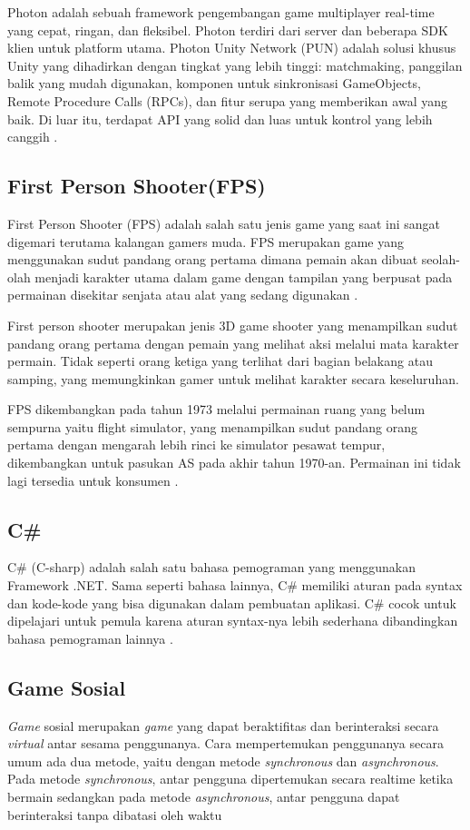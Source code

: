 Photon adalah sebuah framework pengembangan game multiplayer real-time yang cepat, ringan, dan fleksibel. Photon terdiri dari server dan beberapa SDK klien untuk platform utama.
Photon Unity Network (PUN) adalah solusi khusus Unity yang dihadirkan dengan tingkat yang lebih tinggi: matchmaking, panggilan balik yang mudah digunakan, komponen untuk sinkronisasi GameObjects, Remote Procedure Calls (RPCs), dan fitur serupa yang memberikan awal yang baik. Di luar itu, terdapat API yang solid dan luas untuk kontrol yang lebih canggih \cite{pun}.

\subsection{First Person Shooter(FPS)}
\noindent

First Person Shooter (FPS) adalah salah satu jenis game yang saat ini sangat digemari terutama kalangan gamers muda. FPS merupakan game yang menggunakan sudut pandang orang pertama dimana pemain akan dibuat seolah-olah menjadi karakter utama dalam game dengan tampilan yang berpusat pada permainan disekitar senjata atau alat yang sedang digunakan \cite{fps}.

First person shooter merupakan jenis 3D game shooter yang menampilkan sudut pandang orang pertama dengan 
pemain yang melihat aksi melalui mata karakter permain. Tidak seperti orang ketiga yang terlihat dari bagian 
belakang atau samping, yang memungkinkan gamer untuk melihat karakter secara keseluruhan\cite{fps}.

FPS dikembangkan pada tahun 1973 melalui permainan ruang yang belum sempurna yaitu flight simulator, yang 
menampilkan sudut pandang orang pertama dengan mengarah lebih rinci ke simulator pesawat tempur, dikembangkan untuk pasukan AS pada akhir tahun 1970-an. Permainan ini tidak lagi tersedia untuk konsumen \cite{fps}.

\subsection{C\#}
\noindent

C\# (C-sharp) adalah salah satu bahasa pemograman yang menggunakan Framework .NET. Sama seperti 
bahasa lainnya, C\# memiliki aturan pada syntax dan kode-kode yang bisa digunakan dalam pembuatan aplikasi. 
C\# cocok untuk dipelajari untuk pemula karena aturan syntax-nya lebih sederhana dibandingkan bahasa 
pemograman lainnya \cite{Ansori}.

\subsection{Game Sosial}
\noindent

\textit{Game} sosial merupakan \textit{game} yang dapat beraktifitas dan 
berinteraksi secara \textit{virtual} antar sesama penggunanya. Cara 
mempertemukan penggunanya secara umum ada dua metode, 
yaitu dengan metode \textit{synchronous} dan \textit{asynchronous}. Pada 
metode \textit{synchronous}, antar pengguna dipertemukan secara 
realtime ketika bermain sedangkan pada metode \textit{asynchronous}, 
antar pengguna dapat berinteraksi tanpa dibatasi oleh waktu \cite{asyncyuhu}


